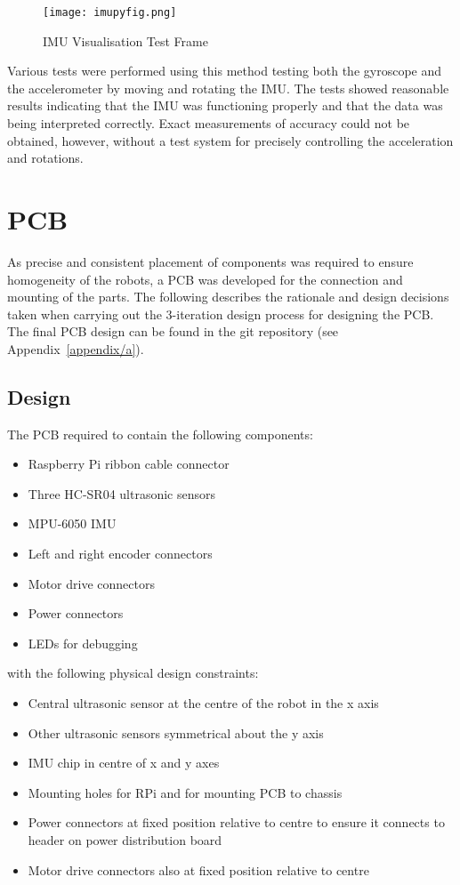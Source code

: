 \begin{figure}[!ht]
	\centering
	\texttt{[image: imupyfig.png]}
	\caption{IMU Visualisation Test Frame}\label{fig:imu_py_test}

\end{figure}

Various tests were performed using this method testing both the gyroscope and the
accelerometer by moving and rotating the IMU. The tests showed reasonable results
indicating that the IMU was functioning properly and that the data was being interpreted
correctly. Exact measurements of accuracy could not be obtained, however, without a test
system for precisely controlling the acceleration and rotations.

\section{PCB}\label{elec/pcb}
As precise and consistent placement of components was required to ensure
homogeneity of the robots, a PCB was developed for the connection
and mounting of the parts. The following
describes the rationale and design decisions taken when carrying out the
3-iteration design process for designing the PCB. The final PCB design can
be found in the git repository (see Appendix~\ref{appendix/a}).

\subsection{Design}\label{elec/pcb/design}
The PCB required to contain the following components:
\begin{itemize}
  \item Raspberry Pi ribbon cable connector
  \item Three HC-SR04 ultrasonic sensors
  \item MPU-6050 IMU
  \item Left and right encoder connectors
  \item Motor drive connectors
  \item Power connectors
  \item LEDs for debugging
\end{itemize}

with the following physical design constraints:

\begin{itemize}
  \item Central ultrasonic sensor at the centre of the robot in the x axis
  \item Other ultrasonic sensors symmetrical about the y axis
  \item IMU chip in centre of x and y axes
  \item Mounting holes for RPi and for mounting PCB to chassis
  \item Power connectors at fixed position relative to centre to ensure it
  connects to header on power distribution board
  \item Motor drive connectors also at fixed position relative to centre
\end{itemize}


